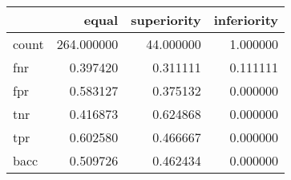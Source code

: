 \begin{tabular}{lrrr}
\toprule
{} &       equal &  superiority &  inferiority \\
\midrule
count &  264.000000 &    44.000000 &     1.000000 \\
fnr   &    0.397420 &     0.311111 &     0.111111 \\
fpr   &    0.583127 &     0.375132 &     0.000000 \\
tnr   &    0.416873 &     0.624868 &     0.000000 \\
tpr   &    0.602580 &     0.466667 &     0.000000 \\
bacc  &    0.509726 &     0.462434 &     0.000000 \\
\bottomrule
\end{tabular}
